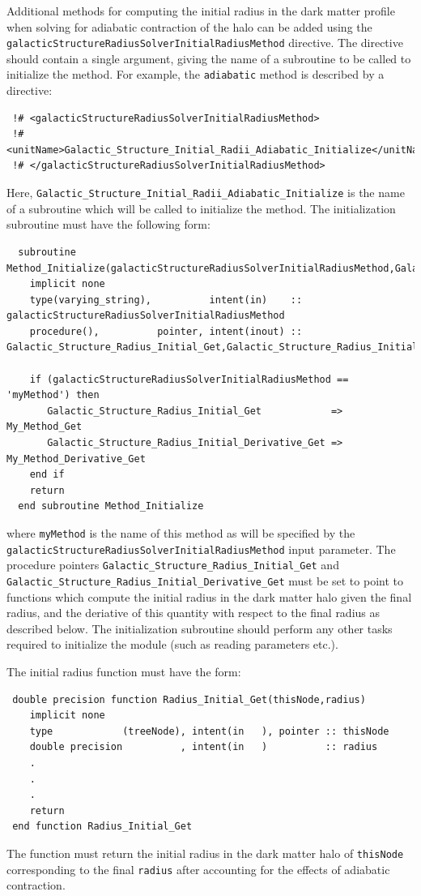 Additional methods for computing the initial radius in the dark matter profile when solving for adiabatic contraction of the halo can be added using the {\tt galacticStructureRadiusSolverInitialRadiusMethod} directive. The directive should contain a single argument, giving the name of a subroutine to be called to initialize the method. For example, the {\tt adiabatic} method is described by a directive:
\begin{verbatim}
 !# <galacticStructureRadiusSolverInitialRadiusMethod>
 !#  <unitName>Galactic_Structure_Initial_Radii_Adiabatic_Initialize</unitName>
 !# </galacticStructureRadiusSolverInitialRadiusMethod>
\end{verbatim}
Here, {\tt Galactic\_Structure\_Initial\_Radii\_Adiabatic\_Initialize} is the name of a subroutine which will be called to initialize the method. The initialization subroutine must have the following form:
\begin{verbatim}
  subroutine Method_Initialize(galacticStructureRadiusSolverInitialRadiusMethod,Galactic_Structure_Radius_Initial_Get,Galactic_Structure_Radius_Initial_Derivative_Get)
    implicit none
    type(varying_string),          intent(in)    :: galacticStructureRadiusSolverInitialRadiusMethod
    procedure(),          pointer, intent(inout) :: Galactic_Structure_Radius_Initial_Get,Galactic_Structure_Radius_Initial_Derivative_Get
    
    if (galacticStructureRadiusSolverInitialRadiusMethod == 'myMethod') then
       Galactic_Structure_Radius_Initial_Get            => My_Method_Get
       Galactic_Structure_Radius_Initial_Derivative_Get => My_Method_Derivative_Get
    end if
    return
  end subroutine Method_Initialize
\end{verbatim}
where {\tt myMethod} is the name of this method as will be specified by the {\tt galacticStructureRadiusSolverInitialRadiusMethod} input parameter. The procedure pointers {\tt Galactic\_Structure\_Radius\_Initial\_Get} and {\tt Galactic\_Structure\_Radius\_Initial\_Derivative\_Get} must be set to point to functions which compute the initial radius in the dark matter halo given the final radius, and the deriative of this quantity with respect to the final radius as described below. The initialization subroutine should perform any other tasks required to initialize the module (such as reading parameters etc.).

The initial radius function must have the form:
\begin{verbatim}
 double precision function Radius_Initial_Get(thisNode,radius)
    implicit none
    type            (treeNode), intent(in   ), pointer :: thisNode
    double precision          , intent(in   )          :: radius
    .
    .
    .
    return
 end function Radius_Initial_Get
\end{verbatim}
The function must return the initial radius in the dark matter halo of {\tt thisNode} corresponding to the final {\tt radius} after accounting for the effects of adiabatic contraction.


